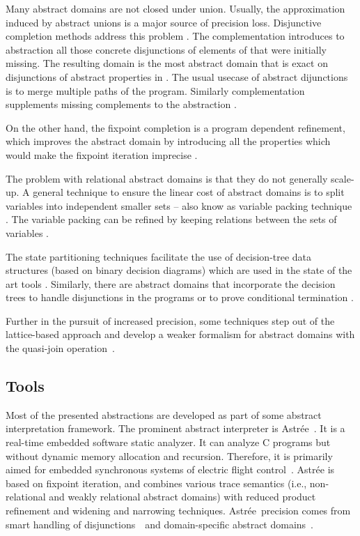 Many abstract domains are not closed under union. Usually, the approximation
induced by abstract unions is a major source of precision loss. Disjunctive
completion methods address this problem \cite{File1999}. The complementation
introduces to abstraction \domain{} all those concrete disjunctions of elements
of \domain{} that were initially missing. The resulting domain is the most
abstract domain that is exact on disjunctions of abstract properties in
\domain{}.  The usual usecase of abstract dijunctions is to merge multiple paths
of the program.  Similarly complementation supplements missing complements to the
abstraction \cite{Cortesi1995}.

On the other hand, the fixpoint completion is a program dependent refinement,
which improves the abstract domain by introducing all the properties which
would make the fixpoint iteration imprecise \cite{Giacobazzi2000,
Giacobazzi2001}.

The problem with relational abstract domains is that they do not generally
scale-up. A general technique to ensure the linear cost of abstract domains is
to split variables into independent smaller sets -- also know as variable
packing technique \cite{Mine2006}. The variable packing can be refined by
keeping relations between the sets of variables \cite{Bouzaziz2012}.

The state partitioning techniques \cite{Muchnick1981} facilitate the use of
decision-tree data structures (based on binary decision diagrams) which are
used in the state of the art tools \cite{Cousot2010, Bertrane2015}.
Similarly, there are abstract domains that incorporate the decision trees to
handle disjunctions in the programs \cite{Cousot2010a} or to prove conditional
termination \cite{Urban2010}.

Further in the pursuit of increased precision, some techniques step out of the
lattice-based approach and develop a weaker formalism for abstract domains with
the quasi-join ope\-ra\-tion~\cite{Gange2013}.

\subsection{ Tools }

Most of the presented abstractions are developed as part of some abstract
interpretation framework. The prominent abstract interpreter is
Astrée~\cite{Astree}. It is a real-time embedded software static analyzer. It
can analyze C programs but without dynamic memory allocation and recursion.
Therefore, it is primarily aimed for embedded synchronous systems of electric
flight control~\cite{Delmas2007, Souyris2007, Bouissou2009, Bertrane2015}.
Astrée is based on fixpoint iteration, and combines various trace semantics
(i.e., non-relational and weakly relational abstract domains) with reduced
product refinement and widening and narrowing techniques. Astrée precision
comes from smart handling of disjunctions~\cite{Blanchet2003,
Mauborgne2005} and domain-specific abstract domains~\cite{Feret2004,
Feret2005}.

